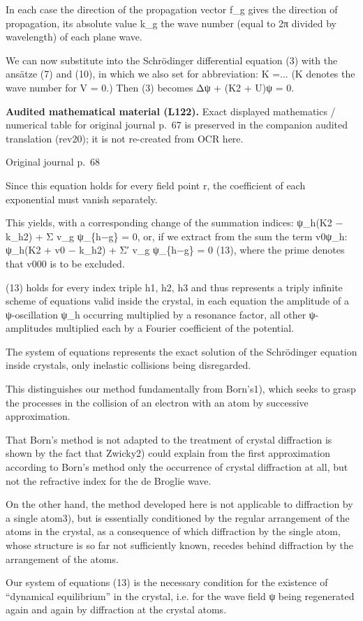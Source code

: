 \documentclass[10pt]{article}
\newcommand{\origpage}[1]{\par\medskip\noindent\hfill{\small\color{notegray}Original journal p.~#1}\hfill\mbox{}\par\smallskip}
\newcommand{\mathref}[2]{\par\smallskip\noindent\colorbox{gray!8}{\parbox{0.95\linewidth}{\small\color{notegray}\textbf{Audited mathematical material (L#1).} Exact displayed mathematics / numerical table for original journal p.~#2 is preserved in the companion audited translation (rev20); it is not re-created from OCR here.}}\par\smallskip}
\begin{document}
In each case the direction of the propagation vector f\_g gives the direction of propagation, its absolute value k\_g the wave number (equal to 2π divided by wavelength) of each plane wave.\par
We can now substitute into the Schrödinger differential equation (3) with the ansätze (7) and (10), in which we also set for abbreviation: K =... (K denotes the wave number for V = 0.) Then (3) becomes Δψ + (K2 + U)ψ = 0.\par
\mathref{122}{67}
\origpage{68}
Since this equation holds for every field point r, the coefficient of each exponential must vanish separately.\par
This yields, with a corresponding change of the summation indices: ψ\_h(K2 − k\_h2) + Σ v\_g ψ\_\{h−g\} = 0, or, if we extract from the sum the term v0ψ\_h: ψ\_h(K2 + v0 − k\_h2) + Σ′ v\_g ψ\_\{h−g\} = 0 (13), where the prime denotes that v000 is to be excluded.\par
(13) holds for every index triple h1, h2, h3 and thus represents a triply infinite scheme of equations valid inside the crystal, in each equation the amplitude of a ψ-oscillation ψ\_h occurring multiplied by a resonance factor, all other ψ-amplitudes multiplied each by a Fourier coefficient of the potential.\par
The system of equations represents the exact solution of the Schrödinger equation inside crystals, only inelastic collisions being disregarded.\par
This distinguishes our method fundamentally from Born’s1), which seeks to grasp the processes in the collision of an electron with an atom by successive approximation.\par
That Born’s method is not adapted to the treatment of crystal diffraction is shown by the fact that Zwicky2) could explain from the first approximation according to Born’s method only the occurrence of crystal diffraction at all, but not the refractive index for the de Broglie wave.\par
On the other hand, the method developed here is not applicable to diffraction by a single atom3), but is essentially conditioned by the regular arrangement of the atoms in the crystal, as a consequence of which diffraction by the single atom, whose structure is so far not sufficiently known, recedes behind diffraction by the arrangement of the atoms.\par
Our system of equations (13) is the necessary condition for the existence of “dynamical equilibrium” in the crystal, i.e. for the wave field ψ being regenerated again and again by diffraction at the crystal atoms.\par
\end{document}
